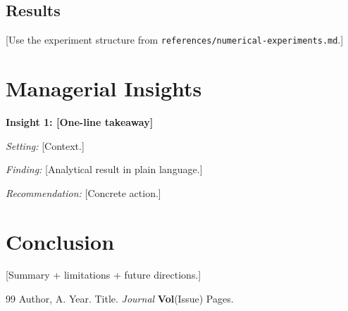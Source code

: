\documentclass[12pt,letterpaper]{article}
\theoremstyle{definition}
\begin{document}
\subsection{Results}

[Use the experiment structure from \texttt{references/numerical-experiments.md}.]

\section{Managerial Insights}

\noindent\textbf{Insight 1: [One-line takeaway]}

\textit{Setting:} [Context.]

\textit{Finding:} [Analytical result in plain language.]

\textit{Recommendation:} [Concrete action.]

\section{Conclusion}

[Summary + limitations + future directions.]

\newpage
\begin{thebibliography}{99}
Author, A. Year. Title. \textit{Journal} \textbf{Vol}(Issue) Pages.
\end{thebibliography}
\end{document}
